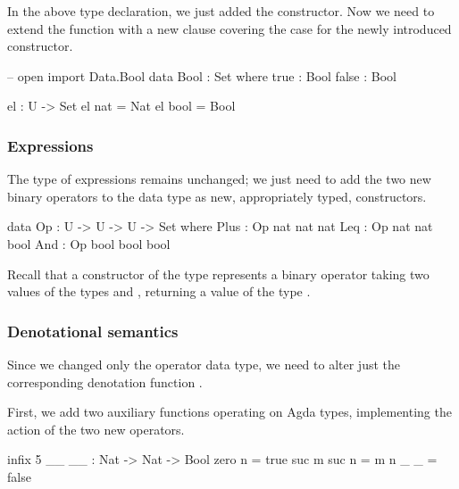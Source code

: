 \noindent In the above type declaration, we just added the 
constructor. Now we need to extend the function  with a new clause
covering the case for the newly introduced  constructor.

\begin{code}
  -- open import Data.Bool
  data Bool : Set where
    true : Bool
    false : Bool

  el : U -> Set
  el nat = Nat
  el bool = Bool
\end{code}\label{sec:lin-el}

\subsubsection{Expressions}

The type of expressions  remains unchanged; we just need to add the two new
binary operators to the data type  as new, appropriately typed,
constructors.

\noindent \begin{minipage}{\textwidth}
\begin{code}
  data Op : U -> U -> U -> Set where
    Plus : Op nat nat nat
    Leq : Op nat nat bool
    And : Op bool bool bool
\end{code}\label{sec:more-operators}
\end{minipage}

\noindent Recall that a constructor of the type  represents a
binary operator taking two values of the types  and ,
returning a value of the type .

\subsubsection{Denotational semantics}

Since we changed only the operator data type, we need to alter just the
corresponding denotation function .

First, we add two auxiliary functions operating on Agda types, implementing
the action of the two new operators.

\begin{code}
  infix 5 _\leq\_
  _\leq\_ : Nat -> Nat -> Bool
  zero \leq n = true
  suc m \leq suc n = m \leq n
  _ \leq _ = false
\end{code}

